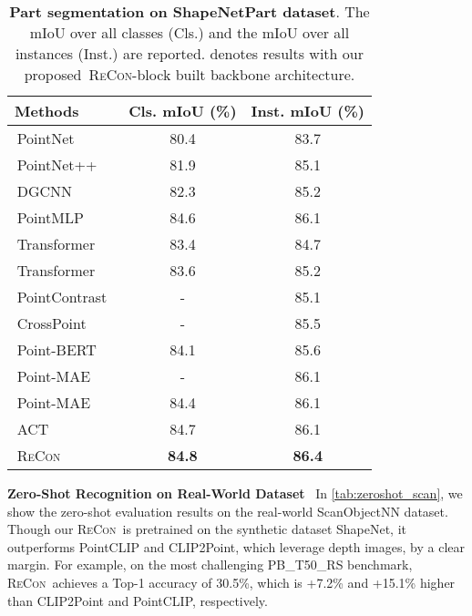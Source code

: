 \documentclass{article}
\theoremstyle{plain}
\theoremstyle{definition}
\theoremstyle{remark}
\def\recon{{\scshape ReCon}}
\newcommand{\reconcolor}[1]{\textcolor{reconcolor}{#1}}
\newcommand{\vitcolor}[1]{\textcolor{vitcolor}{#1}}
\newcommand{\br}{\reconcolor{\,}} \newcommand{\bv}{\vitcolor{\,}}  \newcommand{\bs}{\vitcolor{\,}} \newcommand{\bh}{\reconcolor{\,}}
\begin{document}
\begin{center}
\begin{table}[h!]
\vspace{-5pt}
\caption{\textbf{Part segmentation on ShapeNetPart dataset}. The mIoU over all classes (Cls.) and the mIoU over all instances (Inst.) are reported.
 denotes results with our proposed \br \recon-block built backbone architecture.
}
\label{tab:partseg}
\centering
\begin{tabular}{lcc}
\toprule[0.95pt]
Methods & Cls. mIoU (\%) & Inst. mIoU (\%)\\
\midrule[0.6pt]
\bs PointNet~\citep{PointNet}  & 80.4 & 83.7\\
\bs PointNet++~\citep{PointNet++} & 81.9 & 85.1\\
\bs DGCNN~\citep{DGCNN} & 82.3 & 85.2\\
\bs PointMLP~\citep{PointMLP} & 84.6 & 86.1\\
\midrule[0.6pt]
\bv Transformer~\citep{AttentionIsAllYouNeed} & 83.4 & 84.7\\
\br Transformer~\citep{AttentionIsAllYouNeed} & 83.6 & 85.2\\
\bs PointContrast~\citep{PointContrast20} & - & 85.1\\
\bs CrossPoint~\citep{CrossPoint22} & - & 85.5\\
\bv Point-BERT~\citep{PointBERT} & 84.1 & 85.6\\
\bv Point-MAE~\citep{PointMAE} & - & 86.1\\
\br Point-MAE~\citep{PointMAE} & 84.4 & 86.1\\
\bv ACT~\citep{ACT23} & 84.7 & 86.1\\
\rowcolor{linecolor}\br\recon & \textbf{84.8} & \textbf{86.4} \\
\bottomrule[0.95pt]
\end{tabular}
\end{table}
\end{center} 
\textbf{Zero-Shot Recognition on Real-World Dataset}~
In \cref{tab:zeroshot_scan}, we show the zero-shot evaluation results on the real-world ScanObjectNN dataset. 
Though our \recon\ is pretrained on the synthetic dataset ShapeNet, it outperforms PointCLIP and CLIP2Point, which leverage depth images, by a clear margin. 
For example, on the most challenging PB\_T50\_RS benchmark, \recon\ achieves a Top-1 accuracy of 30.5\%, which is +7.2\% and +15.1\% higher than CLIP2Point and PointCLIP, respectively.  
\end{document}
